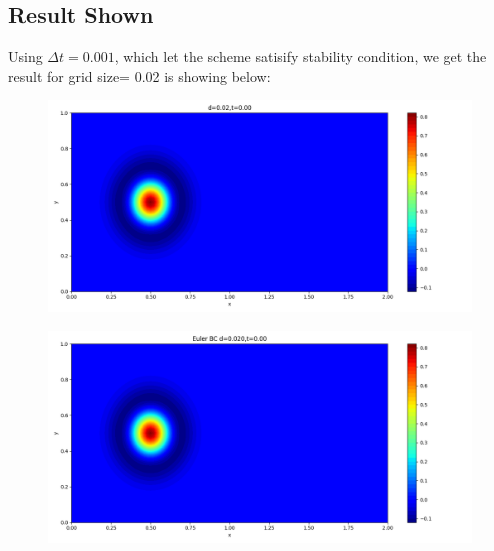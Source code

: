 \documentclass[12pt]{article}
\begin{document}
\subsection{Result Shown}
Using $\Delta t = 0.001$, which let the scheme satisify stability condition,
we get the result for grid size= 0.02 is showing below:
\begin{figure}[H]
    \centering
    \begin{minipage}{\linewidth}
    \centering
    \begin{minipage}{0.5\textwidth}
    \includegraphics[width=\linewidth]{figures/3d0.02t0.00.png}
    \label{fig1}
    \end{minipage}\hfill
    \begin{minipage}{0.5\textwidth}
    \includegraphics[width=\linewidth]{figures/3Ed0.020t0.00.png}
    \label{fig2}
    \end{minipage}
    \vspace{-1.5em}
    

\end{minipage}
\end{figure}
\end{document}
